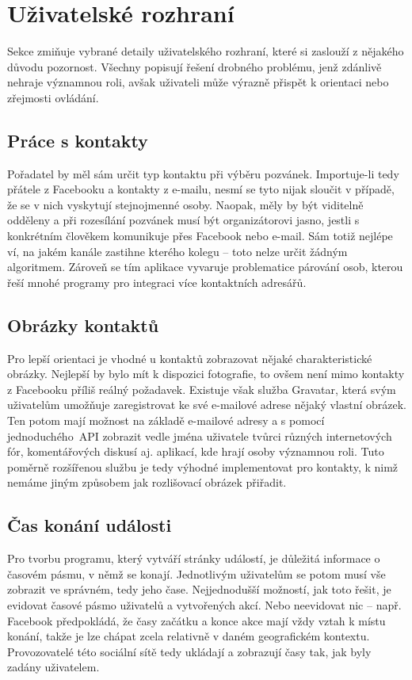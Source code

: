 \documentclass[12pt,oneside,final]{fithesis2}
\begin{document}
\section{Uživatelské rozhraní}
Sekce zmiňuje vybrané detaily uživatelského rozhraní, které si zaslouží z nějakého důvodu pozornost. Všechny popisují řešení drobného problému, jenž zdánlivě nehraje významnou roli, avšak uživateli může výrazně přispět k orientaci nebo zřejmosti ovládání.

\subsection{Práce s kontakty}\label{separateContactTypes}
Pořadatel by měl sám určit typ kontaktu při výběru pozvánek. Importuje-li tedy přátele z Facebooku a kontakty z e-mailu, nesmí se tyto nijak sloučit v případě, že se v nich vyskytují stejnojmenné osoby. Naopak, měly by být viditelně odděleny a při rozesílání pozvánek musí být organizátorovi jasno, jestli s konkrétním člověkem komunikuje přes Facebook nebo e-mail. Sám totiž nejlépe ví, na jakém kanále zastihne kterého kolegu -- toto nelze určit žádným algoritmem. Zároveň se tím aplikace vyvaruje problematice párování osob, kterou řeší mnohé programy pro integraci více kontaktních adresářů.

\subsection{Obrázky kontaktů}
Pro lepší orientaci je vhodné u kontaktů zobrazovat nějaké charakteristické obrázky. Nejlepší by bylo mít k dispozici fotografie, to ovšem není mimo kontakty z Facebooku příliš reálný požadavek. Existuje však služba Gravatar, která svým uživatelům umožňuje zaregistrovat ke své e-mailové adrese nějaký vlastní obrázek. Ten potom mají možnost na základě e-mailové adresy a s pomocí jednoduchého~API zobrazit vedle jména uživatele tvůrci různých internetových fór, komentářových diskusí aj. aplikací, kde hrají osoby významnou roli. Tuto poměrně rozšířenou službu je tedy výhodné implementovat pro kontakty, k nimž nemáme jiným způsobem jak rozlišovací obrázek přiřadit.

\subsection{Čas konání události}\label{timezone}
Pro tvorbu programu, který vytváří stránky událostí, je důležitá informace o časovém pásmu, v němž se konají. Jednotlivým uživatelům se potom musí vše zobrazit ve správném, tedy jeho čase. Nejjednodušší možností, jak toto řešit, je evidovat časové pásmo uživatelů a vytvořených akcí. Nebo neevidovat nic -- např. Facebook předpokládá, že časy začátku a konce akce mají vždy vztah k místu konání, takže je lze chápat zcela relativně v daném geografickém kontextu. Provozovatelé této sociální sítě tedy ukládají a zobrazují časy tak, jak byly zadány uživatelem.
\end{document}
